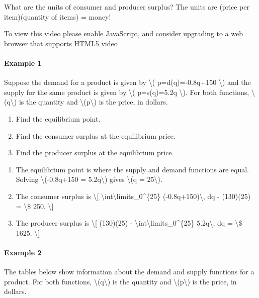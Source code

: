What are the units of consumer and producer surplus? The units are
(price per item)(quantity of items) = money!

To view this video please enable JavaScript, and consider upgrading to a
web browser that \href{http://videojs.com/html5-video-support/}{supports
HTML5 video}

\hypertarget{example-1}{%
\paragraph{Example 1}\label{example-1}}

Suppose the demand for a product is given by \textbackslash{}(
p=d(q)=-0.8q+150 \textbackslash{}) and the supply for the same product
is given by \textbackslash{}( p=s(q)=5.2q \textbackslash{}). For both
functions, \textbackslash{}(q\textbackslash{}) is the quantity and
\textbackslash{}(p\textbackslash{}) is the price, in dollars.

\begin{enumerate}
\tightlist
\item
  Find the equilibrium point.
\item
  Find the consumer surplus at the equilibrium price.
\item
  Find the producer surplus at the equilibrium price.
\end{enumerate}

\begin{enumerate}
\tightlist
\item
  The equilibrium point is where the supply and demand functions are
  equal. Solving \textbackslash{}(-0.8q+150 = 5.2q\textbackslash{})
  gives \textbackslash{}(q = 25\textbackslash{}).
\item
  The consumer surplus is \textbackslash{}{[}
  \textbackslash{}int\textbackslash{}limits\_0\^{}\{25\}
  (-0.8q+150)\textbackslash{}, dq - (130)(25) = \textbackslash{}\$ 250.
  \textbackslash{}{]}
\item
  The producer surplus is \textbackslash{}{[} (130)(25) -
  \textbackslash{}int\textbackslash{}limits\_0\^{}\{25\}
  5.2q\textbackslash{}, dq = \textbackslash{}\$ 1625.
  \textbackslash{}{]}
\end{enumerate}

\hypertarget{example-2}{%
\paragraph{Example 2}\label{example-2}}

The tables below show information about the demand and supply functions
for a product. For both functions, \textbackslash{}(q\textbackslash{})
is the quantity and \textbackslash{}(p\textbackslash{}) is the price, in
dollars.

